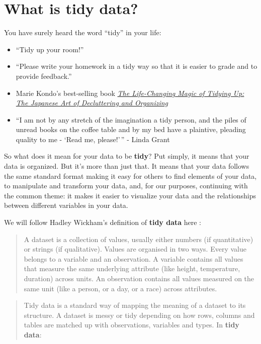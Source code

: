 \documentclass[]{tufte-book}
\providecommand{\tightlist}{%
  \setlength{\itemsep}{0pt}\setlength{\parskip}{0pt}}
\begin{document}
\section{What is tidy data?}\label{what-is-tidy-data}

You have surely heard the word ``tidy'' in your life:

\begin{itemize}
\tightlist
\item
  ``Tidy up your room!''
\item
  ``Please write your homework in a tidy way so that it is easier to
  grade and to provide feedback.''
\item
  Marie Kondo's best-selling book
  \href{https://www.amazon.com/Life-Changing-Magic-Tidying-Decluttering-Organizing/dp/1607747308/ref=sr_1_1?ie=UTF8\&qid=1469400636\&sr=8-1\&keywords=tidying+up}{\emph{The
  Life-Changing Magic of Tidying Up: The Japanese Art of Decluttering
  and Organizing}}
\item
  ``I am not by any stretch of the imagination a tidy person, and the
  piles of unread books on the coffee table and by my bed have a
  plaintive, pleading quality to me - `Read me, please!'\,'' - Linda
  Grant
\end{itemize}

So what does it mean for your data to be \textbf{tidy}? Put simply, it
means that your data is organized. But it's more than just that. It
means that your data follows the same standard format making it easy for
others to find elements of your data, to manipulate and transform your
data, and, for our purposes, continuing with the common theme: it makes
it easier to visualize your data and the relationships between different
variables in your data.

We will follow Hadley Wickham's definition of \textbf{tidy data} here
\citep{tidy}:

\begin{quote}
A dataset is a collection of values, usually either numbers (if
quantitative) or strings (if qualitative). Values are organised in two
ways. Every value belongs to a variable and an observation. A variable
contains all values that measure the same underlying attribute (like
height, temperature, duration) across units. An observation contains all
values measured on the same unit (like a person, or a day, or a race)
across attributes.
\end{quote}

\begin{quote}
Tidy data is a standard way of mapping the meaning of a dataset to its
structure. A dataset is messy or tidy depending on how rows, columns and
tables are matched up with observations, variables and types. In
\textbf{tidy data}:
\end{quote}
\end{document}
